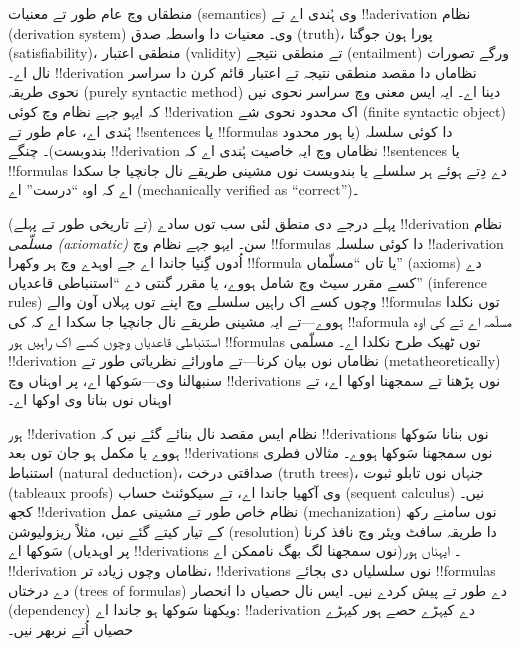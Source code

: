 \documentclass[../../../include/open-logic-section]{subfiles}
\begin{document}
      {}
      {}


منطقاں وچ عام طور تے معنیات (semantics) وی ہُندی اے تے !!a{derivation}
نظام (derivation system) وی۔ معنیات دا واسطہ صدق (truth)، پورا ہون
جوگتا (satisfiability)، منطقی اعتبار (validity) تے منطقی نتیجے
(entailment) ورگے تصورات نال اے۔ !!{derivation} نظاماں دا مقصد منطقی
نتیجہ تے اعتبار قائم کرن دا سراسر نحوی طریقہ (purely syntactic method)
دینا اے۔ ایہ ایس معنی وچ سراسر نحوی نیں کہ ایہو جہے نظام وچ کوئی
!!{derivation} اک محدود نحوی شے (finite syntactic object)
ہُندی اے، عام طور تے !!{sentence}s یا !!{formula}s دا کوئی سلسلہ (یا
ہور محدود بندوبست)۔ چنگے !!{derivation} نظاماں وچ ایہ خاصیت ہُندی اے
کہ !!{sentence}s یا !!{formula}s دے دِتے ہوئے ہر سلسلے یا بندوبست نوں
مشینی طریقے نال جانچیا جا سکدا اے کہ اوہ ``درست'' اے (mechanically
verified as ``correct'')۔

پہلے درجے دی منطق لئی سب توں سادے (تے تاریخی طور تے پہلے)
!!{derivation} نظام \emph{مسلّمی (axiomatic)} سن۔ ایہو جہے نظام وچ !!{formula}s
دا کوئی سلسلہ !!a{derivation} اُدوں گِنیا جاندا اے جے اوہدے وچ ہر
وکھرا !!{formula} یا تاں ``مسلّماں'' (axioms) دے کسے مقرر سیٹ وچ شامل ہووے،
یا مقرر گنتی دے ``استنباطی قاعدیاں'' (inference rules) وچوں کسے اک راہیں سلسلے وچ اپنے
توں پہلاں آون والے !!{formula}s توں نکلدا ہووے---تے ایہ مشینی طریقے
نال جانچیا جا سکدا اے کہ کی !!a{formula} مسلّمہ اے تے کی اوہ استنباطی
قاعدیاں وچوں کسے اک راہیں ہور !!{formula}s توں ٹھیک طرح نکلدا اے۔
مسلّمی !!{derivation} نظاماں نوں بیان کرنا---تے ماورائے نظریاتی طور
تے (metatheoretically) سنبھالنا وی---سَوکھا اے، پر اوہناں وچ !!{derivation}s نوں پڑھنا تے
سمجھنا اوکھا اے، تے اوہناں نوں بنانا وی اوکھا اے۔

ہور !!{derivation} نظام ایس مقصد نال بنائے گئے نیں کہ !!{derivation}s
نوں بنانا سَوکھا ہووے یا مکمل ہو جان توں بعد !!{derivation}s نوں
سمجھنا سَوکھا ہووے۔ مثالاں فطری استنباط (natural deduction)، صداقتی
درخت (truth trees)، جنہاں نوں تابلو ثبوت (tableaux proofs) وی آکھیا
جاندا اے، تے سیکوئنٹ حساب (sequent calculus) نیں۔ کجھ !!{derivation}
نظام خاص طور تے مشینی عمل (mechanization) نوں سامنے رکھ کے تیار کیتے
گئے نیں، مثلاً ریزولیوشن (resolution) دا طریقہ سافٹ ویئر وچ نافذ کرنا سَوکھا اے (پر اوہدیاں
!!{derivation}s نوں سمجھنا لگ بھگ ناممکن اے)۔ ایہناں ہور !!{derivation}
نظاماں وچوں زیادہ تر، !!{derivation}s نوں سلسلیاں دی بجائے !!{formula}s
دے درختاں (trees of formulas) دے طور تے پیش کردے نیں۔ ایس نال حصیاں
دا انحصار (dependency) ویکھنا سَوکھا ہو جاندا اے: !!a{derivation} دے
کیہڑے حصے ہور کیہڑے حصیاں اُتے نربھر نیں۔
\end{document}
